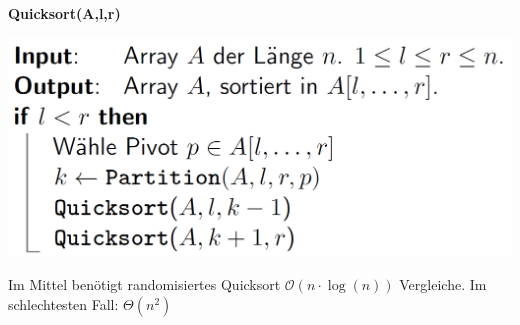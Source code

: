 \begin{sectionbox}
\textbf{Quicksort(A,l,r)}\par
\includegraphics[width = 0.8\columnwidth]{../img/QuicksortCode.png}
\par\smallskip
\begin{greenbox}
Im Mittel benötigt randomisiertes Quicksort $\mathcal{O}(n \cdot \operatorname{log}(n))$ Vergleiche. Im schlechtesten Fall: $\Theta(n^2)$
\end{greenbox}
\end{sectionbox}

